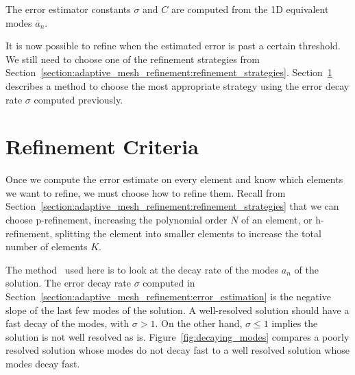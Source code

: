 \noindent
The error estimator constants \(\sigma \) and \(C\) are computed from the 1D equivalent modes
\(\overline{a}_n\).

It is now possible to refine when the estimated error is past a certain threshold. We still need to
choose one of the refinement strategies from
Section~\ref{section:adaptive_mesh_refinement:refinement_strategies}.
Section~\ref{section:adaptive_mesh_refinement:refinement_criteria} describes a method to choose the
most appropriate strategy using the error decay rate \(\sigma \) computed previously.

\section{Refinement Criteria}\label{section:adaptive_mesh_refinement:refinement_criteria}

Once we compute the error estimate on every element and know which elements we want to refine, we
must choose how to refine them. Recall from
Section~\ref{section:adaptive_mesh_refinement:refinement_strategies} that we can choose
p-refinement, increasing the polynomial order \(N\) of an element, or h-refinement, splitting the
element into smaller elements to increase the total number of elements \(K\).

The method~\cite{Mavriplis1990} used here is to look at the decay rate of the modes \(a_n\) of the
solution. The error decay rate \(\sigma \) computed in
Section~\ref{section:adaptive_mesh_refinement:error_estimation} is the negative slope of the last
few modes of the solution. A well-resolved solution should have a fast decay of the modes, with
\(\sigma > 1\). On the other hand, \(\sigma \leqslant 1\) implies the solution is not well resolved
as is. Figure~\ref{fig:decaying_modes} compares a poorly resolved solution whose modes do not decay
fast to a well resolved solution whose modes decay fast.

